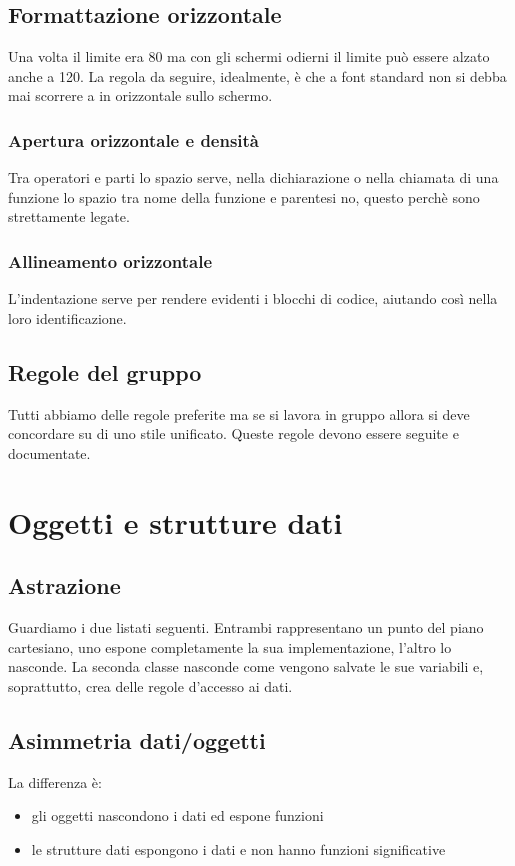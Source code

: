 \documentclass[11pt,a4paper]{book}
\begin{document}
\section{Formattazione orizzontale}
Una volta il limite era 80 ma con gli schermi odierni il limite può essere alzato anche a 120. La regola da seguire, idealmente, è che a font standard non si debba mai scorrere a in orizzontale sullo schermo.

\subsection{Apertura orizzontale e densità}
Tra operatori e parti lo spazio serve, nella dichiarazione o nella chiamata di una funzione lo spazio tra nome della funzione e parentesi no, questo perchè sono strettamente legate.

\subsection{Allineamento orizzontale}
L'indentazione serve per rendere evidenti i blocchi di codice, aiutando così nella loro identificazione.

\section{Regole del gruppo}
Tutti abbiamo delle regole preferite ma se si lavora in gruppo allora si deve concordare su di uno stile unificato. Queste regole devono essere seguite e documentate.

\chapter{Oggetti e strutture dati}
\section{Astrazione}
Guardiamo i due listati seguenti. Entrambi rappresentano un punto del piano cartesiano, uno espone completamente la sua implementazione, l'altro lo nasconde.
\label{code: 038}
\label{code: 039}
La seconda classe nasconde come vengono salvate le sue variabili e, soprattutto, crea delle regole d'accesso ai dati. 

\section{Asimmetria dati/oggetti}
La differenza è:
\begin{itemize}
	\item gli oggetti nascondono i dati ed espone funzioni
	\item le strutture dati espongono i dati e non hanno funzioni significative
\end{itemize}
\end{document}
